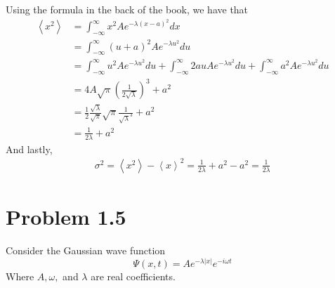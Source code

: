 \documentclass{article}
\newcommand{\braket}[1]{\left\langle #1 \right\rangle}
\newcommand{\intinf}{\int_{-\infty}^\infty}
\begin{document}
\begin{enumerate}[label=(\alph*)]
      Using the formula in the back of the book, we have that
      \begin{align*}
        \braket{x^2} &= \intinf x^2 Ae^{-\lambda (x - a)^2} dx \\
                     &= \intinf (u + a)^2 Ae^{-\lambda u^2} du \\
                     &= \intinf u^2 A e^{-\lambda u^2}du + \intinf 2auAe^{-\lambda u^2}du + \intinf a^2Ae^{-\lambda u^2}du \\
                     &= 4A\sqrt{\pi}(\frac{1}{2\sqrt{\lambda}})^3  + a^2 \\
                     &= \frac{1}{2} \frac{\sqrt\lambda}{\sqrt\pi} \sqrt{\pi} \frac{1}{\sqrt{\lambda}^3} + a^2 \\
                     &= \frac{1}{2 \lambda} + a^2
      \end{align*}
      And lastly, 
      \begin{align*}
        \sigma^2 = \braket{x^2} - \braket{x}^2 = \frac{1}{2\lambda} + a^2 - a^2 = \frac{1}{2\lambda}
      \end{align*}
  \end{enumerate}


\section{Problem 1.5}
  Consider the Gaussian wave function
  \[ \Psi(x, t) = Ae^{-\lambda |x|}e^{-i\omega t} \]
  Where $A, \omega,$ and $\lambda$ are real coefficients.
\end{document}
